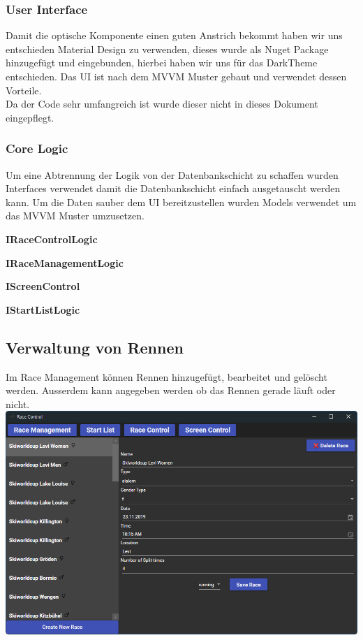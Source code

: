 \documentclass[a4paper, 12pt]{article}
\begin{document}
	\subsubsection{User Interface}
	
	Damit die optische Komponente einen guten Anstrich bekommt haben wir uns entschieden Material Design zu verwenden, dieses wurde als Nuget Package hinzugefügt und eingebunden, hierbei haben wir uns für das DarkTheme entschieden. Das UI ist nach dem MVVM Muster gebaut und verwendet dessen Vorteile.\\
	Da der Code sehr umfangreich ist wurde dieser nicht in dieses Dokument eingepflegt.
	
	\newpage
	\subsubsection{Core Logic}
	Um eine Abtrennung der Logik von der Datenbankschicht zu schaffen wurden Interfaces verwendet damit die Datenbankschicht einfach ausgetauscht werden kann. Um die Daten sauber dem UI bereitzustellen wurden Models verwendet um das MVVM Muster umzusetzen.
	\newline
	
	\textbf{IRaceControlLogic}
	
	\textbf{IRaceManagementLogic}
	
	\textbf{IScreenControl}
	
	\textbf{IStartListLogic}
	
	
	\subsection{Verwaltung von Rennen}
	Im Race Management können Rennen hinzugefügt, bearbeitet und gelöscht werden. Ausserdem kann angegeben werden ob das Rennen gerade läuft oder nicht.
	\newline
	\includegraphics[width=.7\textwidth]{img/ui_raceManagement.png}
	\newline
	
\end{document}
